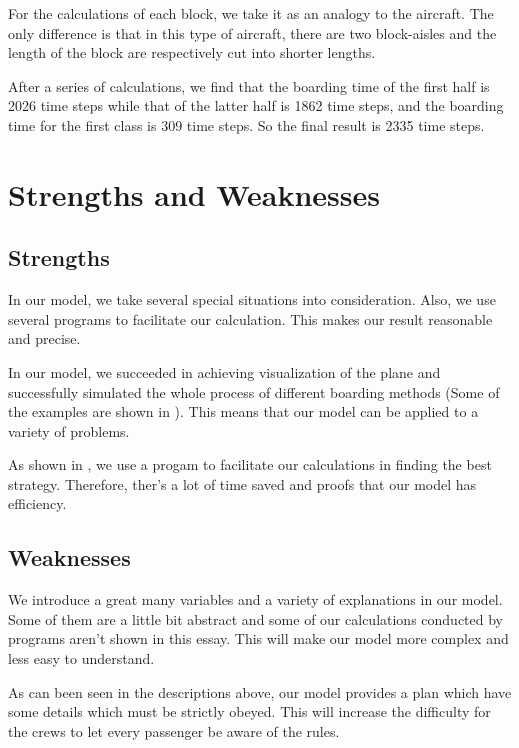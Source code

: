 \documentclass{article}
\theoremstyle{definition}
\theoremstyle{remark}
\numberwithin{equation}{section}
\begin{document}
	For the calculations of each block, we take it as an analogy to the  aircraft. The only difference is that in this type of aircraft, there are two block-aisles and the length of the block are respectively cut into shorter lengths.

	After a series of calculations, we find that the boarding time of the first half is 2026 time steps while that of the latter half is 1862 time steps, and the boarding time for the first class is 309 time steps. So the final result is 2335 time steps.
	\section{Strengths and Weaknesses}
	\subsection*{Strengths}
	\begin{itemize}

		In our model, we take several special situations into consideration. Also, we use several programs to facilitate our calculation. This makes our result reasonable and precise.

		In our model, we succeeded in achieving visualization of the plane and  successfully simulated the whole process of different boarding methods (Some of the examples are shown in ).  This means that our model can be applied to a variety of problems.

		As shown in , we use a progam to facilitate our calculations in finding the best strategy. Therefore, ther's a lot of time saved and proofs that our model has efficiency.
	\end{itemize}

	\subsection*{Weaknesses}
	\begin{itemize}
		\itembf{Complexity}

		We introduce a great many variables and a variety of explanations in our model. Some of them are a little bit abstract and some of our calculations conducted by programs aren't shown in this essay. This will make our model more complex and less easy to understand.
		\itembf{Difficult to operate}

		As can been seen in the descriptions above, our model provides a plan which have some details which must be strictly obeyed. This will increase the difficulty for the crews to let every passenger be aware of the rules.
	\end{itemize}
\end{document}
